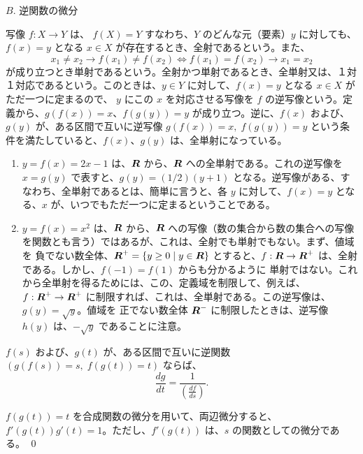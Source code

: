 \medskip
$B$. 逆関数の微分

写像 $f: X \to Y$ は、 $f(X) = Y$ すなわち、$Y$ のどんな元（要素）$y$ に対しても、$f(x) = y$ となる $x\in X$ が存在するとき、全射であるという。また、
$$x_1\neq x_2 \to f(x_1)\neq f(x_2) \Leftrightarrow f(x_1) = f(x_2) \to x_1 = x_2$$
が成り立つとき単射であるという。全射かつ単射であるとき、全単射又は、１対１対応であるという。このときは、$y\in Y$ に対して、$f(x) = y$ となる $x\in X$ がただ一つに定まるので、 $y$ にこの $x$ を対応させる写像を $f$ の逆写像という。定義から、$g(f(x)) = x$、$f(g(y)) = y$ が成り立つ。逆に、$f(x)$ および、$g(y)$ が、ある区間で互いに逆写像 $g(f(x)) = x, \;f(g(y)) = y$ という条件を満たしていると、$f(x)$、$g(y)$ は、全単射になっている。


\begin{eg}
\begin{enumerate}
\item $y = f(x) = 2x -1$ は、$\mbox{\boldmath $R$}$ から、$\mbox{\boldmath $R$}$ への全単射である。これの逆写像を $x = g(y)$ で表すと、$g(y) = (1/2)(y+1)$ となる。逆写像がある、すなわち、全単射であるとは、簡単に言うと、各 $y$ に対して、$f(x) = y$ となる、$x$ が、いつでもただ一つに定まるということである。
\item $y = f(x) = x^2$ は、$\mbox{\boldmath $R$}$ から、$\mbox{\boldmath $R$}$ への写像（数の集合から数の集合への写像を関数とも言う）ではあるが、これは、全射でも単射でもない。まず、値域を 負でない数全体、$\mbox{\boldmath $R$}^+ = \{y\geq 0\mid y\in \mbox{\boldmath $R$}\}$ とすると、$f:\mbox{\boldmath $R$} \to \mbox{\boldmath $R$}^+$ は、全射である。しかし、$f(-1) = f(1)$ からも分かるように 単射ではない。これから全単射を得るためには、この、定義域を制限して、例えば、$f:\mbox{\boldmath $R$}^+\to\mbox{\boldmath $R$}^+$ に制限すれば、これは、全単射である。この逆写像は、$g(y) = \sqrt{y}$。値域を 正でない数全体 $\mbox{\boldmath $R$}^-$ に制限したときは、逆写像 $h(y)$ は、$-\sqrt{y}$ であることに注意。
\end{enumerate}
\end{eg}

\begin{prop}
$f(s)$ および、$g(t)$ が、ある区間で互いに逆関数 $(g(f(s)) = s, \;f(g(t)) = t)$ ならば、
$$\frac{dg}{dt} = \frac{1}{(\frac{df}{ds})}.$$
\end{prop}
\proof
$f(g(t)) = t$ を合成関数の微分を用いて、両辺微分すると、$f'(g(t))g'(t) = 1$。ただし、$f'(g(t))$ は、$s$ の関数としての微分である。
\qed

